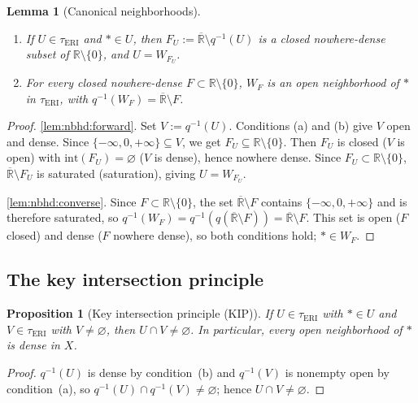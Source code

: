 \documentclass[11pt]{article}
\newtheorem{lemma}[theorem]{Lemma}
\newtheorem{proposition}[theorem]{Proposition}
\theoremstyle{definition}
\theoremstyle{remark}
\begin{document}
\begin{lemma}[Canonical neighborhoods]\label{lem:nbhd}
\begin{enumerate}[label=\textup{(\roman*)},nosep]
\item\label{lem:nbhd:forward}
If $U \in \tau_{\mathrm{ERI}}$ and $\ast \in U$, then
$F_U := \overline{\mathbb{R}} \setminus q^{-1}(U)$ is a closed
nowhere-dense subset of\/ $\mathbb{R}\setminus\{0\}$, and $U = W_{F_U}$.
\item\label{lem:nbhd:converse}
For every closed nowhere-dense $F \subset \mathbb{R}\setminus\{0\}$,
$W_F$ is an open neighborhood of $\ast$ in $\tau_{\mathrm{ERI}}$, with
$q^{-1}(W_F) = \overline{\mathbb{R}} \setminus F$.
\end{enumerate}
\end{lemma}
\begin{proof}
\ref{lem:nbhd:forward}.\;
Set $V := q^{-1}(U)$.  Conditions (a) and (b) give $V$ open and dense.
Since $\{-\infty,0,+\infty\} \subseteq V$, we get
$F_U \subseteq \mathbb{R}\setminus\{0\}$.
Then $F_U$ is closed ($V$ is open) with $\mathrm{int}(F_U) = \varnothing$
($V$ is dense), hence nowhere dense.
Since $F_U \subset \mathbb{R}\setminus\{0\}$,
$\overline{\mathbb{R}}\setminus F_U$ is saturated
(saturation), giving $U = W_{F_U}$.

\ref{lem:nbhd:converse}.\;
Since $F \subset \mathbb{R}\setminus\{0\}$, the set
$\overline{\mathbb{R}} \setminus F$ contains $\{-\infty,0,+\infty\}$
and is therefore saturated, so
$q^{-1}(W_F) = q^{-1}(q(\overline{\mathbb{R}} \setminus F))
= \overline{\mathbb{R}} \setminus F$.
This set is open ($F$ closed) and dense ($F$ nowhere dense),
so both conditions hold; $\ast \in W_F$.
\end{proof}

\subsection{The key intersection principle}

\begin{proposition}[Key intersection principle (KIP)]
\label{prop:kip}
If $U \in \tau_{\mathrm{ERI}}$ with $\ast \in U$ and
$V \in \tau_{\mathrm{ERI}}$ with $V \neq \varnothing$, then
$U \cap V \neq \varnothing$.
In particular, every open neighborhood of $\ast$ is dense in $X$.
\end{proposition}
\begin{proof}
$q^{-1}(U)$ is dense by condition~(b) and $q^{-1}(V)$ is nonempty open
by condition~(a), so $q^{-1}(U) \cap q^{-1}(V) \neq \varnothing$; hence
$U \cap V \neq \varnothing$.
\end{proof}
\end{document}
